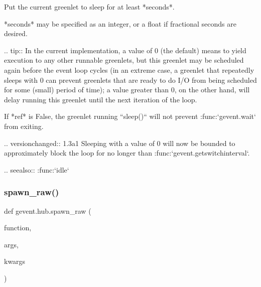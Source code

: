 \begin{DoxyVerb}Put the current greenlet to sleep for at least *seconds*.

*seconds* may be specified as an integer, or a float if fractional
seconds are desired.

.. tip:: In the current implementation, a value of 0 (the default)
   means to yield execution to any other runnable greenlets, but
   this greenlet may be scheduled again before the event loop
   cycles (in an extreme case, a greenlet that repeatedly sleeps
   with 0 can prevent greenlets that are ready to do I/O from
   being scheduled for some (small) period of time); a value greater than
   0, on the other hand, will delay running this greenlet until
   the next iteration of the loop.

If *ref* is False, the greenlet running ``sleep()`` will not prevent :func:`gevent.wait`
from exiting.

.. versionchanged:: 1.3a1
   Sleeping with a value of 0 will now be bounded to approximately block the
   loop for no longer than :func:`gevent.getswitchinterval`.

.. seealso:: :func:`idle`
\end{DoxyVerb}
 \mbox{\label{namespacegevent_1_1hub_a4c863334efd5024caef0053418d24d3b}} 
\subsubsection{\texorpdfstring{spawn\+\_\+raw()}{spawn\_raw()}}
{\footnotesize\ttfamily def gevent.\+hub.\+spawn\+\_\+raw (\begin{DoxyParamCaption}\item[{}]{function,  }\item[{}]{args,  }\item[{}]{kwargs }\end{DoxyParamCaption})}

